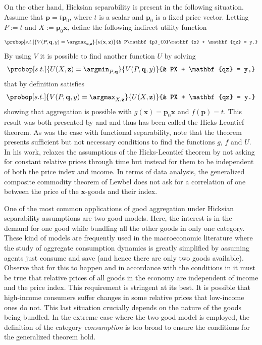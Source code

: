 \documentclass[english, a4paper, 12pt]{article}
\begin{document}
On the other hand, Hicksian separability is present in the following situation. Assume that $\mathbf{p} = t\mathbf{p}_{0}$, where $t$ is a scalar and $\mathbf{p}_{0}$ is a fixed price vector. Letting $P := t$ and $X := \mathbf{p}_{0}\mathbf{x}$, define the following indirect utility function
	$$	\probop[s.t.]{V(P, \mathbf{q}, y) = \argmax_{\mathbf{x}, \mathbf{z}}}{u(\mathbf{x}, \mathbf{z})}
				{&	P\mathbf{p}_{0}\mathbf{x} + \mathbf{qz} = y.}
	$$
By using $V$ it is possible to find another function $U$ by solving
	$$	\probop[s.t.]{U(X, \mathbf{z}) = \argmin_{P, \mathbf{q}}}{V(P, \mathbf{q},y)}
				{&	PX + \mathbf{qz} = y,}
	$$
that by definition satisfies
	$$	\probop[s.t.]{V(P, \mathbf{q}, y) = \argmax_{X, \mathbf{z}}}{U(X, \mathbf{z})}
				{&	PX + \mathbf{qz} = y.}
	$$
showing that aggregation is possible with $g(\mathbf{x}) = \mathbf{p}_{0}\mathbf{x}$ and $f(\mathbf{p}) = t$. This result was both presented by \cite{Leontief36} and \cite{HicksBook} and thus has been called the Hicks-Leontief theorem. As was the case with functional separability, note that the theorem presents sufficient but not necessary conditions to find the functions $g$, $f$ and $U$. In his work, \cite{Lewbel96} relaxes the assumptions of the Hicks-Leontief theorem by not asking for constant relative prices through time but instead for them to be independent of both the price index and income. In terms of data analysis, the generalized composite commodity theorem of Lewbel does not ask for a correlation of one between the price of the $\mathbf{x}$-goods and their index.

One of the most common applications of good aggregation under Hicksian separability assumptions are two-good models. Here, the interest is in the demand for one good while bundling all the other goods in only one category. These kind of models are frequently used in the macroeconomic literature where the study of aggregate consumption dynamics is greatly simplified by assuming agents just consume and save (and hence there are only two goods available). Observe that for this to happen and in accordance with the conditions in \cite{Lewbel96} it must be true that relative prices of all goods in the economy are independent of income and the price index. This requirement is stringent at its best. It is possible that high-income consumers suffer changes in some relative prices that low-income ones do not. This last situation crucially depends on the nature of the goods being bundled. In the extreme case where the two-good model is employed, the definition of the category \textit{consumption} is too broad to ensure the conditions for the generalized theorem hold.
\end{document}
